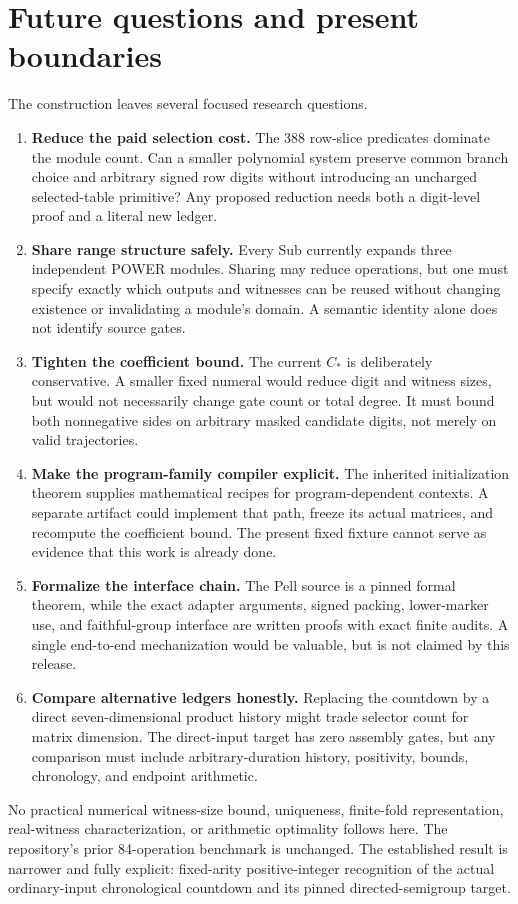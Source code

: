 \documentclass[11pt,letterpaper]{article}
\theoremstyle{definition}
\theoremstyle{remark}
\begin{document}
\section{Future questions and present boundaries}
\label{gts:cm:sec:future}
The construction leaves several focused research questions.
\begin{enumerate}
\item \textbf{Reduce the paid selection cost.} The 388 row-slice predicates dominate the module count. Can a smaller polynomial system preserve common branch choice and arbitrary signed row digits without introducing an uncharged selected-table primitive? Any proposed reduction needs both a digit-level proof and a literal new ledger.
\item \textbf{Share range structure safely.} Every Sub currently expands three independent POWER modules. Sharing may reduce operations, but one must specify exactly which outputs and witnesses can be reused without changing existence or invalidating a module's domain. A semantic identity alone does not identify source gates.
\item \textbf{Tighten the coefficient bound.} The current $C_*$ is deliberately conservative. A smaller fixed numeral would reduce digit and witness sizes, but would not necessarily change gate count or total degree. It must bound both nonnegative sides on arbitrary masked candidate digits, not merely on valid trajectories.
\item \textbf{Make the program-family compiler explicit.} The inherited initialization theorem supplies mathematical recipes for program-dependent contexts. A separate artifact could implement that path, freeze its actual matrices, and recompute the coefficient bound. The present fixed fixture cannot serve as evidence that this work is already done.
\item \textbf{Formalize the interface chain.} The Pell source is a pinned formal theorem, while the exact adapter arguments, signed packing, lower-marker use, and faithful-group interface are written proofs with exact finite audits. A single end-to-end mechanization would be valuable, but is not claimed by this release.
\item \textbf{Compare alternative ledgers honestly.} Replacing the countdown by a direct seven-dimensional product history might trade selector count for matrix dimension. The direct-input target has zero assembly gates, but any comparison must include arbitrary-duration history, positivity, bounds, chronology, and endpoint arithmetic.
\end{enumerate}
No practical numerical witness-size bound, uniqueness, finite-fold representation, real-witness characterization, or arithmetic optimality follows here. The repository's prior 84-operation benchmark \cite{cm-gamma} is unchanged. The established result is narrower and fully explicit: fixed-arity positive-integer recognition of the actual ordinary-input chronological countdown and its pinned directed-semigroup target.
\end{document}
